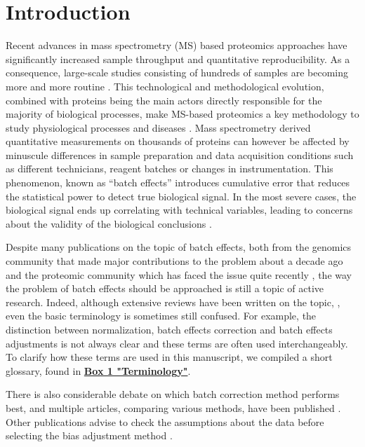 \documentclass[num-refs]{wiley-article}
\begin{document}
\section{Introduction}

Recent advances in mass spectrometry (MS) based proteomics approaches have significantly increased sample throughput and quantitative reproducibility. As a consequence, large-scale studies consisting of hundreds of samples are becoming more and more routine \cite{ Williams:2016aa, Liu2015, Sajic2018, Okada2016, Collins2017, mertins2016proteogenomics, zhang2014proteogenomic, zhang2016integrated}. This technological and methodological evolution, combined with proteins being the main actors directly responsible for the majority of biological processes, make MS-based proteomics a key methodology to study physiological processes and diseases \cite{Schubert2017}. Mass spectrometry derived quantitative measurements on thousands of proteins can however be affected by minuscule differences in sample preparation and data acquisition conditions such as different technicians, reagent batches or changes in instrumentation. This phenomenon, known as “batch effects” introduces cumulative error that reduces the statistical power to detect true biological signal. In the most severe cases, the biological signal ends up correlating with technical variables, leading to concerns about the validity of the biological conclusions \cite{Leek:2010aa, Akey:2007aa, Baggerly:2004aa, Petricoin:2002aa}.

Despite many publications on the topic of batch effects, both from the genomics community that made major contributions to the problem about a decade ago \cite{Leek:2010aa, Lazar:2013aa, Luo2010, Chen:2011ac, Dillies:2013aa, Chawade:2014aa} and the proteomic community which has faced the issue quite recently \cite{Karpievitch2012, Chawade:2014aa, Valikangas2018, Gregori2012}, the way the problem of batch effects should be approached is still a topic of active research. Indeed, although extensive reviews have been written on the topic, \cite{Lazar:2013aa, Leek:2010aa}, even the basic terminology is sometimes still confused. For example, the distinction between normalization, batch effects correction and batch effects adjustments is not always clear and these terms are often used interchangeably. To clarify how these terms are used in this manuscript, we compiled a short glossary, found in \textbf{\hyperref[box:Box1_definitions]{Box 1 "Terminology"}}. 

There is also considerable debate on which batch correction method performs best, and multiple articles, comparing various methods, have been published \cite{Luo2010, Chen:2011ac, Chawade:2014aa}. Other publications advise to check the assumptions about the data before selecting the bias adjustment method \cite{Evans:2018aa, GOH2017498}. 
\end{document}
